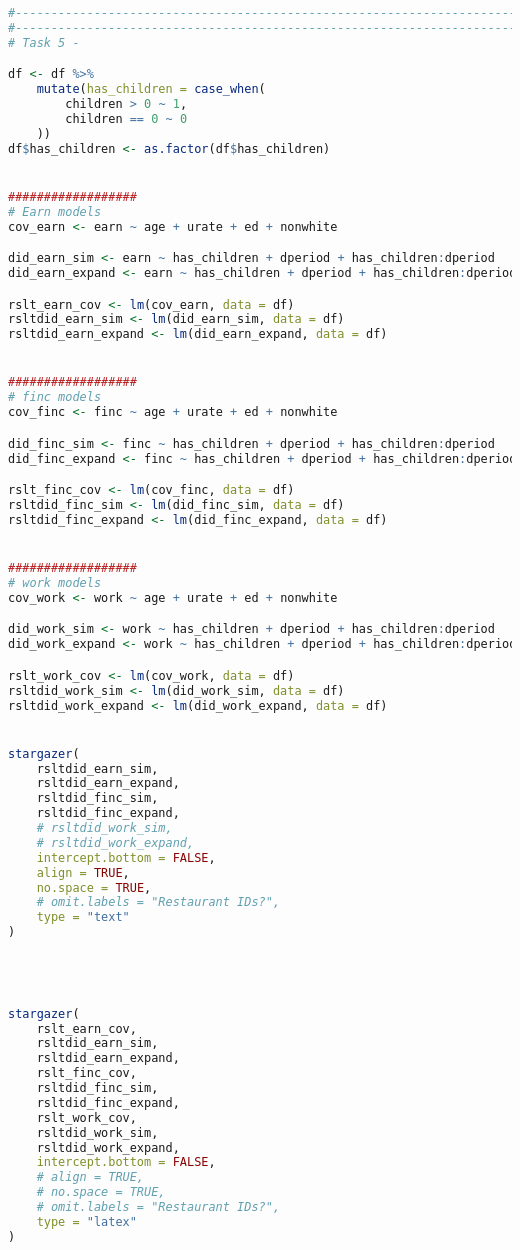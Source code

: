 \documentclass[a4paper]{article}
\begin{document}
\begin{lstlisting}[language=R]
#---------------------------------------------------------------------------------------
#---------------------------------------------------------------------------------------
# Task 5 -

df <- df %>%
    mutate(has_children = case_when(
        children > 0 ~ 1,
        children == 0 ~ 0
    ))
df$has_children <- as.factor(df$has_children)


##################
# Earn models
cov_earn <- earn ~ age + urate + ed + nonwhite

did_earn_sim <- earn ~ has_children + dperiod + has_children:dperiod
did_earn_expand <- earn ~ has_children + dperiod + has_children:dperiod + age + urate + ed + nonwhite

rslt_earn_cov <- lm(cov_earn, data = df)
rsltdid_earn_sim <- lm(did_earn_sim, data = df)
rsltdid_earn_expand <- lm(did_earn_expand, data = df)


##################
# finc models
cov_finc <- finc ~ age + urate + ed + nonwhite

did_finc_sim <- finc ~ has_children + dperiod + has_children:dperiod
did_finc_expand <- finc ~ has_children + dperiod + has_children:dperiod + age + urate + ed + nonwhite

rslt_finc_cov <- lm(cov_finc, data = df)
rsltdid_finc_sim <- lm(did_finc_sim, data = df)
rsltdid_finc_expand <- lm(did_finc_expand, data = df)


##################
# work models
cov_work <- work ~ age + urate + ed + nonwhite

did_work_sim <- work ~ has_children + dperiod + has_children:dperiod
did_work_expand <- work ~ has_children + dperiod + has_children:dperiod + age + urate + ed + nonwhite

rslt_work_cov <- lm(cov_work, data = df)
rsltdid_work_sim <- lm(did_work_sim, data = df)
rsltdid_work_expand <- lm(did_work_expand, data = df)


stargazer(
    rsltdid_earn_sim,
    rsltdid_earn_expand,
    rsltdid_finc_sim,
    rsltdid_finc_expand,
    # rsltdid_work_sim,
    # rsltdid_work_expand,
    intercept.bottom = FALSE,
    align = TRUE,
    no.space = TRUE,
    # omit.labels = "Restaurant IDs?",
    type = "text"
)




stargazer(
    rslt_earn_cov,
    rsltdid_earn_sim,
    rsltdid_earn_expand,
    rslt_finc_cov,
    rsltdid_finc_sim,
    rsltdid_finc_expand,
    rslt_work_cov,
    rsltdid_work_sim,
    rsltdid_work_expand,
    intercept.bottom = FALSE,
    # align = TRUE,
    # no.space = TRUE,
    # omit.labels = "Restaurant IDs?",
    type = "latex"
)




\end{lstlisting}
\end{document}
